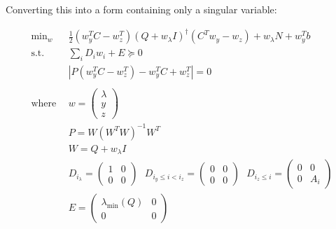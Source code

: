 \documentclass{article}
\begin{document}
Converting this into a form containing only a singular variable:

\begin{align}
	\text{min}_{w} ~ &\frac{1}{2} (w_y^T C - w_z^T) (Q+w_\lambda I)^\dagger (C^Tw_y - w_z) + w_\lambda N + w_y^T b \\ 
	\text{s.t.} ~~ &\sum_i D_i w_i + E \succeq 0 \\
			    &|P(w_y^TC-w_z^T)-w_y^T C+w_z^T| = 0 \\ 
				\\
				\text{where} ~~ &w = \begin{pmatrix}\lambda \\ y \\ z \end{pmatrix} \\
				&P = W (W^T W)^{-1} W^T \\
								&W = Q+w_\lambda I \\
								&D_{i_\lambda} = \begin{pmatrix}1 & 0 \\ 0 & 0 \end{pmatrix} ~~~ D_{i_y\le i<i_z} = \begin{pmatrix}0 & 0 \\ 0 & 0 \end{pmatrix} ~~~ D_{i_z \le i} = \begin{pmatrix}0 & 0 \\ 0 & A_i \end{pmatrix} \\
								&E = \begin{pmatrix}\lambda_\text{min}(Q) & 0 \\ 0 & 0 \end{pmatrix} 
\end{align}
\end{document}
